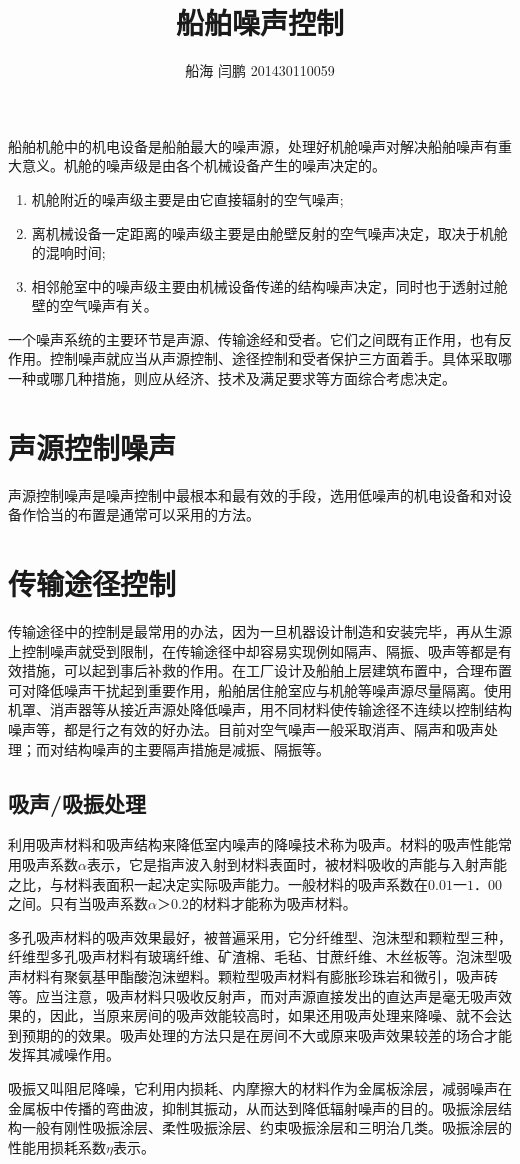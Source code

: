 \documentclass[a4paper]{article}
\begin{document}
\title{船舶噪声控制}
\author{船海 闫鹏 201430110059}
\date{}
\maketitle

船舶机舱中的机电设备是船舶最大的噪声源，处理好机舱噪声对解决船舶噪声有重大意义。机舱的噪声级是由各个机械设备产生的噪声决定的。
\begin{enumerate}
\item 机舱附近的噪声级主要是由它直接辐射的空气噪声;
\item 离机械设备一定距离的噪声级主要是由舱壁反射的空气噪声决定，取决于机舱的混响时间;
\item 相邻舱室中的噪声级主要由机械设备传递的结构噪声决定，同时也于透射过舱壁的空气噪声有关。
\end{enumerate} 
\par 一个噪声系统的主要环节是声源、传输途经和受者。它们之间既有正作用，也有反作用。控制噪声就应当从声源控制、途径控制和受者保护三方面着手。具体采取哪一种或哪几种措施，则应从经济、技术及满足要求等方面综合考虑决定。 
\section{声源控制噪声}
  声源控制噪声是噪声控制中最根本和最有效的手段，选用低噪声的机电设备和对设备作恰当的布置是通常可以采用的方法。
\section{传输途径控制}
传输途径中的控制是最常用的办法，因为一旦机器设计制造和安装完毕，再从生源上控制噪声就受到限制，在传输途径中却容易实现例如隔声、隔振、吸声等都是有效措施，可以起到事后补救的作用。在工厂设计及船舶上层建筑布置中，合理布置可对降低噪声干扰起到重要作用，船舶居住舱室应与机舱等噪声源尽量隔离。使用机罩、消声器等从接近声源处降低噪声，用不同材料使传输途径不连续以控制结构噪声等，都是行之有效的好办法。目前对空气噪声一般采取消声、隔声和吸声处理；而对结构噪声的主要隔声措施是减振、隔振等。
\subsection{吸声/吸振处理}
利用吸声材料和吸声结构来降低室内噪声的降噪技术称为吸声。材料的吸声性能常用吸声系数$\alpha$表示，它是指声波入射到材料表面时，被材料吸收的声能与入射声能之比，与材料表面积一起决定实际吸声能力。一般材料的吸声系数在$0.01一1．00$之间。只有当吸声系数${\alpha}＞0.2$的材料才能称为吸声材料。
\par 多孔吸声材料的吸声效果最好，被普遍采用，它分纤维型、泡沫型和颗粒型三种，纤维型多孔吸声材料有玻璃纤维、矿渣棉、毛毡、甘蔗纤维、木丝板等。泡沫型吸声材料有聚氨基甲酯酸泡沫塑料。颗粒型吸声材料有膨胀珍珠岩和微引，吸声砖等。应当注意，吸声材料只吸收反射声，而对声源直接发出的直达声是毫无吸声效果的，因此，当原来房间的吸声效能较高时，如果还用吸声处理来降噪、就不会达到预期的的效果。吸声处理的方法只是在房间不大或原来吸声效果较差的场合才能发挥其减噪作用。 
\par 吸振又叫阻尼降噪，它利用内损耗、内摩擦大的材料作为金属板涂层，减弱噪声在金属板中传播的弯曲波，抑制其振动，从而达到降低辐射噪声的目的。吸振涂层结构一般有刚性吸振涂层、柔性吸振涂层、约束吸振涂层和三明治几类。吸振涂层的性能用损耗系数$\eta$表示。
\end{document}
